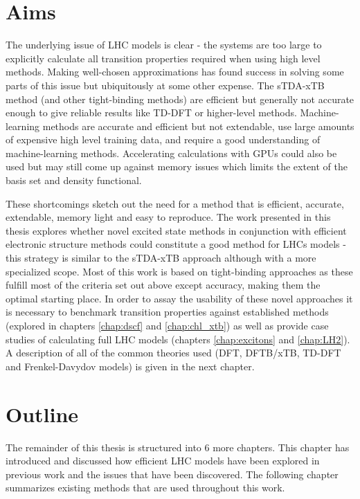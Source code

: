 \section{Aims}
\label{sec:possible_novel_methods}

The underlying issue of LHC models is clear - the systems are too large to explicitly
calculate all transition properties required when using high level methods. Making
well-chosen approximations has found success in solving some parts of this issue
but ubiquitously at some other expense. The sTDA-xTB method (and other tight-binding
methods) are efficient but generally not accurate enough to give reliable results 
like TD-DFT or higher-level methods. Machine-learning methods are accurate and efficient
but not extendable, use large amounts of expensive high level training data, and
require a good understanding of machine-learning methods. Accelerating calculations 
with GPUs could also be used but may still come up against memory issues which limits 
the extent of the basis set and density functional.

These shortcomings sketch out the need for a method that is efficient, accurate,
extendable, memory light and easy to reproduce. The work presented in this thesis
explores whether novel excited state methods in conjunction with efficient electronic 
structure methods could constitute a good method for LHCs models - this strategy 
is similar to the sTDA-xTB approach although with a more specialized scope. Most 
of this work is based on tight-binding approaches as these fulfill most of the criteria 
set out above except accuracy, making them the optimal starting place. In order 
to assay the usability of these novel approaches it is necessary to benchmark transition 
properties against established methods (explored in chapters \ref{chap:dscf} and 
\ref{chap:chl_xtb}) as well as provide case studies of calculating full LHC models 
(chapters \ref{chap:excitons} and \ref{chap:LH2}). A description of all of the common 
theories used (DFT, DFTB/xTB, TD-DFT and Frenkel-Davydov models) is given in the 
next chapter.

\section{Outline}
\label{sec:outline}

The remainder of this thesis is structured into 6 more chapters. This chapter has
introduced and discussed how efficient LHC models have been explored in previous 
work and the issues that have been discovered. The following chapter summarizes 
existing methods that are used throughout this work.

